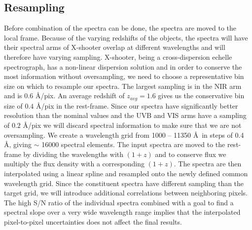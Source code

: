 \documentclass{aa}    %
\newcommand{\sectlabel}[1]{\label{sect:#1}}
\begin{document}
\subsection{Resampling} \sectlabel{rebin}

Before combination of the spectra can be done, the spectra are moved
to the local frame. Because of the varying redshifts of the objects,
the spectra will have their spectral arms of X-shooter overlap at
different wavelengths and will therefore have varying
sampling. X-shooter, being a cross-dispersion echelle spectrograph,
has a non-linear dispersion solution and in order to conserve the most
information without oversampling, we need to choose a representative
bin size on which to resample our spectra. The largest sampling is in
the NIR arm and is $0.6$ \AA/pix. An average redshift of $z_{avg}
= 1.6$ gives us the conservative bin size of $0.4$ \AA/pix in the
rest-frame.  
Since our spectra have significantly better resolution than the
nominal values and the UVB and VIS arms have a sampling of $0.2$
\AA/pix we will discard spectral information to make sure that we are
not oversampling. We create a wavelength grid from 1000 -- 11350 \AA~in
steps of 0.4 \AA, giving $\sim$ 16000 spectral elements. The input spectra are moved to the rest-frame
by dividing the wavelengths with $(1 + z)$ and to conserve flux we
multiply the flux density with a corresponding $(1 + z)$. The spectra
are then interpolated using a linear spline and
resampled onto the newly defined common wavelength grid. Since the
constituent spectra have different sampling than the target grid, we
will introduce additional correlations between neighboring
pixels. The high S/N ratio of the individual spectra combined with a goal to
find a spectral slope over a very wide wavelength range implies that the
interpolated pixel-to-pixel uncertainties does not affect the final results.



\end{document}
